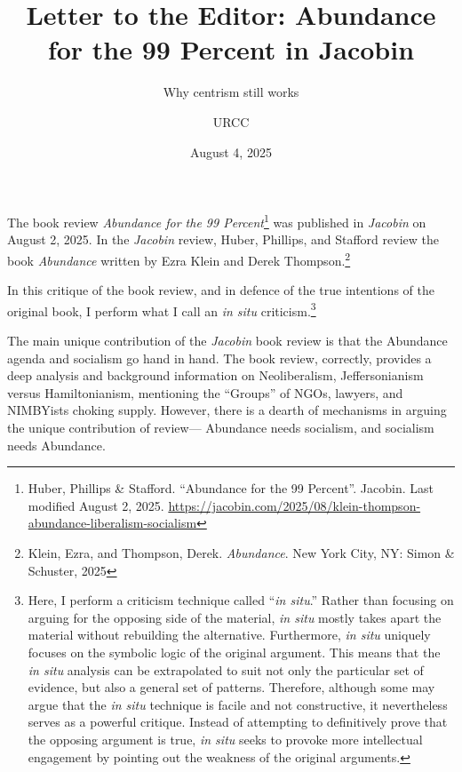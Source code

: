 \documentclass[12pt]{article}
\begin{document}
\title{Letter to the Editor: Abundance for the 99 Percent in Jacobin}

\subtitle{Why centrism still works}

\author{URCC}

\date{August 4, 2025}

\maketitle


\begin{preamble}
	The book review \textit{Abundance for the 99 Percent}\footnote{Huber, Phillips \& Stafford. \enquote{Abundance
for the 99 Percent}. Jacobin. Last modified August 2, 2025. \href{https://jacobin.com/2025/08/klein-thompson-abundance-liberalism-socialism}{https://jacobin.com/2025/08/klein-thompson-abundance-liberalism-socialism}} was published in \textit{Jacobin} on August 2, 2025. In the \textit{Jacobin} review, Huber, Phillips, and Stafford review the book \textit{Abundance} written by Ezra Klein and Derek Thompson.\footnote{Klein, Ezra, and Thompson, Derek. \emph{Abundance}. New York City, NY: Simon \& Schuster, 2025}

	In this critique of the book review, and in defence of the true intentions of the original book, I perform what I call an \textit{in situ} criticism.\footnote{Here, I perform a criticism technique called ``\textit{in situ}.'' Rather than focusing on arguing for the opposing side of the material, \textit{in situ} mostly takes apart the material without rebuilding the alternative. Furthermore, \textit{in situ} uniquely focuses on the symbolic logic of the original argument. This means that the \textit{in situ} analysis can be extrapolated to suit not only the particular set of evidence, but also a general set of patterns. Therefore, although some may argue that the \textit{in situ} technique is facile and not constructive, it nevertheless serves as a powerful critique. Instead of attempting to definitively prove that the opposing argument is true, \textit{in situ} seeks to provoke more intellectual engagement by pointing out the weakness of the original arguments.}
\end{preamble}

The main unique contribution of the \textit{Jacobin} book review is that the Abundance agenda and socialism go hand in hand. The book review, correctly, provides a deep analysis and background information on Neoliberalism, Jeffersonianism versus Hamiltonianism, mentioning the ``Groups'' of NGOs, lawyers, and NIMBYists choking supply. However, there is a dearth of mechanisms in arguing the unique contribution of review--- Abundance needs socialism, and socialism needs Abundance.
\end{document}
